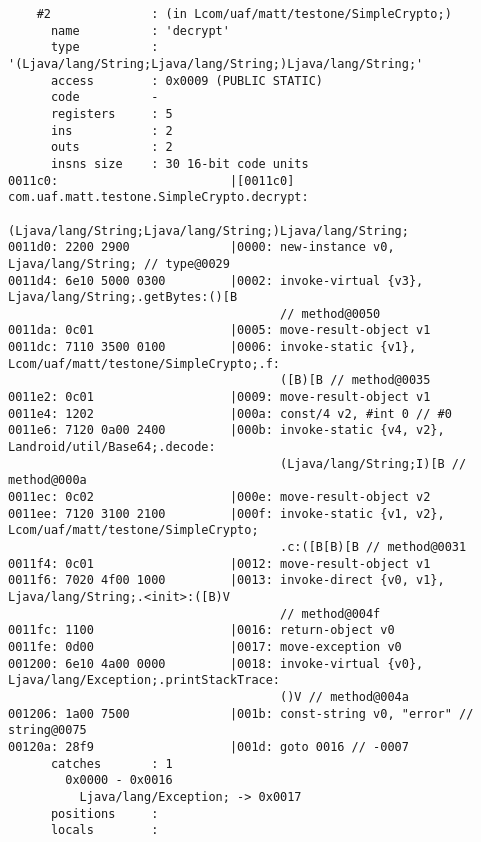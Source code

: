 \begin{lstlisting}
    #2              : (in Lcom/uaf/matt/testone/SimpleCrypto;)
      name          : 'decrypt'
      type          : '(Ljava/lang/String;Ljava/lang/String;)Ljava/lang/String;'
      access        : 0x0009 (PUBLIC STATIC)
      code          -
      registers     : 5
      ins           : 2
      outs          : 2
      insns size    : 30 16-bit code units
0011c0:                        |[0011c0] com.uaf.matt.testone.SimpleCrypto.decrypt:
                                         (Ljava/lang/String;Ljava/lang/String;)Ljava/lang/String;
0011d0: 2200 2900              |0000: new-instance v0, Ljava/lang/String; // type@0029
0011d4: 6e10 5000 0300         |0002: invoke-virtual {v3}, Ljava/lang/String;.getBytes:()[B
                                      // method@0050
0011da: 0c01                   |0005: move-result-object v1
0011dc: 7110 3500 0100         |0006: invoke-static {v1}, Lcom/uaf/matt/testone/SimpleCrypto;.f:
                                      ([B)[B // method@0035
0011e2: 0c01                   |0009: move-result-object v1
0011e4: 1202                   |000a: const/4 v2, #int 0 // #0
0011e6: 7120 0a00 2400         |000b: invoke-static {v4, v2}, Landroid/util/Base64;.decode:
                                      (Ljava/lang/String;I)[B // method@000a
0011ec: 0c02                   |000e: move-result-object v2
0011ee: 7120 3100 2100         |000f: invoke-static {v1, v2}, Lcom/uaf/matt/testone/SimpleCrypto;
                                      .c:([B[B)[B // method@0031
0011f4: 0c01                   |0012: move-result-object v1
0011f6: 7020 4f00 1000         |0013: invoke-direct {v0, v1}, Ljava/lang/String;.<init>:([B)V
                                      // method@004f
0011fc: 1100                   |0016: return-object v0
0011fe: 0d00                   |0017: move-exception v0
001200: 6e10 4a00 0000         |0018: invoke-virtual {v0}, Ljava/lang/Exception;.printStackTrace:
                                      ()V // method@004a
001206: 1a00 7500              |001b: const-string v0, "error" // string@0075
00120a: 28f9                   |001d: goto 0016 // -0007
      catches       : 1
        0x0000 - 0x0016
          Ljava/lang/Exception; -> 0x0017
      positions     :
      locals        :


\end{lstlisting}
